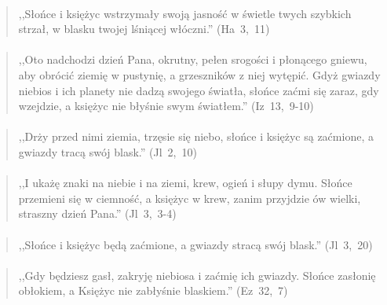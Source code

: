 \documentclass[10pt,a4paper,oneside]{article}
\begin{document}
\paragraph{}
\begin{quote}
,,Słońce i księżyc wstrzymały swoją jasność w świetle twych szybkich strzał, w blasku twojej lśniącej włóczni.'' \mbox{(Ha 3, 11)}
\end{quote}
\paragraph{}
\begin{quote}
,,Oto nadchodzi dzień Pana, okrutny, pełen srogości i płonącego gniewu, aby obrócić ziemię w pustynię, a grzeszników z niej wytępić. Gdyż gwiazdy niebios i ich planety nie dadzą swojego światła, słońce zaćmi się zaraz, gdy wzejdzie, a księżyc nie błyśnie swym światłem.'' \mbox{(Iz 13, 9-10)}
\end{quote}
\paragraph{}
\begin{quote}
,,Drży przed nimi ziemia, trzęsie się niebo, słońce i księżyc są zaćmione, a gwiazdy tracą swój blask.'' \mbox{(Jl 2, 10)}
\end{quote}
\paragraph{}
\begin{quote}
,,I ukażę znaki na niebie i na ziemi, krew, ogień i słupy dymu. Słońce przemieni się w ciemność, a księżyc w krew, zanim przyjdzie ów wielki, straszny dzień Pana.'' \mbox{(Jl 3, 3-4)}
\end{quote}
\paragraph{}
\begin{quote}
,,Słońce i księżyc będą zaćmione, a gwiazdy stracą swój blask.'' \mbox{(Jl 3, 20)}
\end{quote}
\paragraph{}
\begin{quote}
,,Gdy będziesz gasł, zakryję niebiosa i zaćmię ich gwiazdy. Słońce zasłonię obłokiem, a Księżyc nie zabłyśnie blaskiem.'' \mbox{(Ez 32, 7)}
\end{quote}
\end{document}
